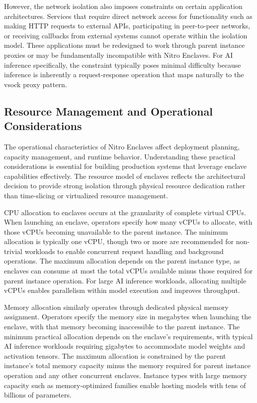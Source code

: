 However, the network isolation also imposes constraints on certain application architectures. Services that require direct network access for functionality such as making HTTP requests to external APIs, participating in peer-to-peer networks, or receiving callbacks from external systems cannot operate within the isolation model. These applications must be redesigned to work through parent instance proxies or may be fundamentally incompatible with Nitro Enclaves. For AI inference specifically, the constraint typically poses minimal difficulty because inference is inherently a request-response operation that maps naturally to the vsock proxy pattern.

\subsection{Resource Management and Operational Considerations}

The operational characteristics of Nitro Enclaves affect deployment planning, capacity management, and runtime behavior. Understanding these practical considerations is essential for building production systems that leverage enclave capabilities effectively. The resource model of enclaves reflects the architectural decision to provide strong isolation through physical resource dedication rather than time-slicing or virtualized resource management.

CPU allocation to enclaves occurs at the granularity of complete virtual CPUs. When launching an enclave, operators specify how many vCPUs to allocate, with those vCPUs becoming unavailable to the parent instance. The minimum allocation is typically one vCPU, though two or more are recommended for non-trivial workloads to enable concurrent request handling and background operations. The maximum allocation depends on the parent instance type, as enclaves can consume at most the total vCPUs available minus those required for parent instance operation. For large AI inference workloads, allocating multiple vCPUs enables parallelism within model execution and improves throughput.

Memory allocation similarly operates through dedicated physical memory assignment. Operators specify the memory size in megabytes when launching the enclave, with that memory becoming inaccessible to the parent instance. The minimum practical allocation depends on the enclave's requirements, with typical AI inference workloads requiring gigabytes to accommodate model weights and activation tensors. The maximum allocation is constrained by the parent instance's total memory capacity minus the memory required for parent instance operation and any other concurrent enclaves. Instance types with large memory capacity such as memory-optimized families enable hosting models with tens of billions of parameters.

